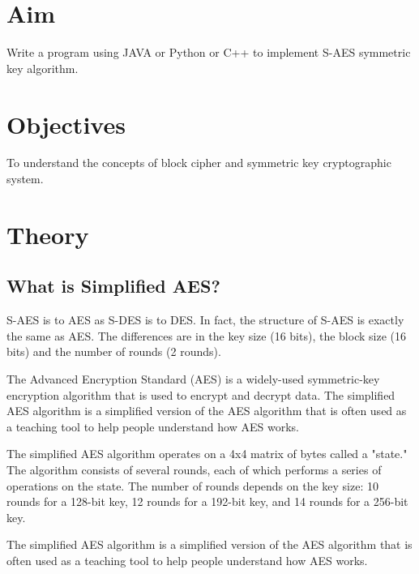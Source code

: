 \documentclass[11pt]{article}
\begin{document}
\tableofcontents
\thispagestyle{empty}
\clearpage

\setcounter{page}{1}

\section{Aim}
Write a program using JAVA or Python or C++ to implement S-AES symmetric key
algorithm.

\section{Objectives}
To understand the concepts of block cipher and symmetric key cryptographic
system.

\section{Theory}

\subsection{What is Simplified AES?}
S-AES is to AES as S-DES is to DES. In fact, the structure of S-AES is exactly the
same as AES. The differences are in the key size (16 bits), the block size (16 bits) and the number
of rounds (2 rounds).

The Advanced Encryption Standard (AES) is a widely-used symmetric-key encryption algorithm that is used to encrypt and decrypt data. The simplified AES algorithm is a simplified version of the AES algorithm that is often used as a teaching tool to help people understand how AES works.

The simplified AES algorithm operates on a 4x4 matrix of bytes called a "state." The algorithm consists of several rounds, each of which performs a series of operations on the state. The number of rounds depends on the key size: 10 rounds for a 128-bit key, 12 rounds for a 192-bit key, and 14 rounds for a 256-bit key.

The simplified AES algorithm is a simplified version of the AES algorithm that is often used as a teaching tool to help people understand how AES works.
\end{document}
